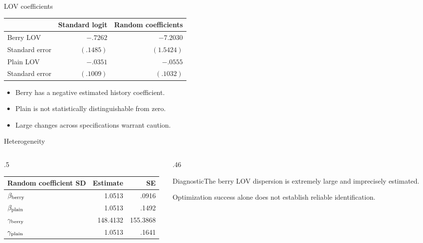\documentclass[aspectratio=169,11pt]{beamer}
\begin{document}
\begin{frame}{LOV coefficients}
\centering
\begin{tabular}{lrr}\toprule
 & Standard logit & Random coefficients\\\midrule
Berry LOV & $-.7262$ & $-7.2030$\\
Standard error & $(.1485)$ & $(1.5424)$\\[2mm]
Plain LOV & $-.0351$ & $-.0555$\\
Standard error & $(.1009)$ & $(.1032)$\\\bottomrule\end{tabular}
\begin{itemize}\item Berry has a negative estimated history coefficient.\item Plain is not statistically distinguishable from zero.\item Large changes across specifications warrant caution.\end{itemize}
\end{frame}

\begin{frame}{Heterogeneity}
\begin{columns}[T]\begin{column}{.5\textwidth}
\small\begin{tabular}{lrr}\toprule
Random coefficient SD & Estimate & SE\\\midrule
$\beta_{\rm berry}$ & 1.0513 & .0916\\
$\beta_{\rm plain}$ & 1.0513 & .1492\\
$\gamma_{\rm berry}$ & 148.4132 & 155.3868\\
$\gamma_{\rm plain}$ & 1.0513 & .1641\\\bottomrule\end{tabular}
\end{column}\begin{column}{.46\textwidth}
\begin{block}{Diagnostic}The berry LOV dispersion is extremely large and imprecisely estimated.\end{block}
Optimization success alone does not establish reliable identification.
\end{column}\end{columns}
\end{frame}
\end{document}
